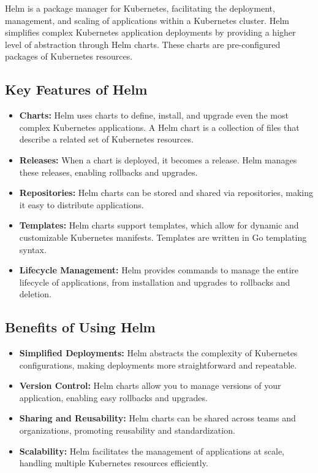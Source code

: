 Helm is a package manager for Kubernetes, facilitating the deployment, management, and scaling of applications within a Kubernetes cluster. Helm simplifies complex Kubernetes application deployments by providing a higher level of abstraction through Helm charts. These charts are pre-configured packages of Kubernetes resources.

\subsection*{Key Features of Helm}
\begin{itemize}
    \item \textbf{Charts:} Helm uses charts to define, install, and upgrade even the most complex Kubernetes applications. A Helm chart is a collection of files that describe a related set of Kubernetes resources.
    \item \textbf{Releases:} When a chart is deployed, it becomes a release. Helm manages these releases, enabling rollbacks and upgrades.
    \item \textbf{Repositories:} Helm charts can be stored and shared via repositories, making it easy to distribute applications.
    \item \textbf{Templates:} Helm charts support templates, which allow for dynamic and customizable Kubernetes manifests. Templates are written in Go templating syntax.
    \item \textbf{Lifecycle Management:} Helm provides commands to manage the entire lifecycle of applications, from installation and upgrades to rollbacks and deletion.
\end{itemize}

\subsection*{Benefits of Using Helm}
\begin{itemize}
    \item \textbf{Simplified Deployments:} Helm abstracts the complexity of Kubernetes configurations, making deployments more straightforward and repeatable.
    \item \textbf{Version Control:} Helm charts allow you to manage versions of your application, enabling easy rollbacks and upgrades.
    \item \textbf{Sharing and Reusability:} Helm charts can be shared across teams and organizations, promoting reusability and standardization.
    \item \textbf{Scalability:} Helm facilitates the management of applications at scale, handling multiple Kubernetes resources efficiently.
\end{itemize}

